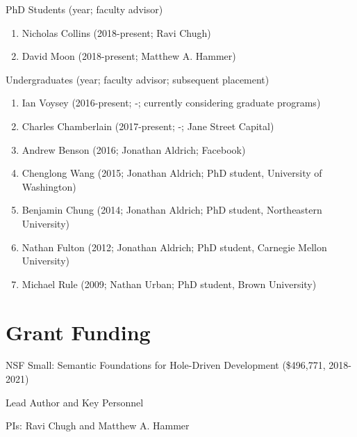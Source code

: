 \documentclass[10pt,letterpaper]{article}
\renewenvironment{itemize}{
  \begin{list}{}{
    \setlength{\leftmargin}{1.25em}
    \setlength{\itemsep}{0.25em}
    \setlength{\parskip}{0pt}
    \setlength{\parsep}{0.2em}
  }
}{
  \end{list}
}
\begin{document}
\begin{itemize}
\item PhD Students (year; faculty advisor)
  \begin{enumerate}
    \item Nicholas Collins (2018-present; Ravi Chugh)
    \item David Moon (2018-present; Matthew A. Hammer)
  \end{enumerate}
\item Undergraduates (year; faculty advisor; subsequent placement)
  \begin{enumerate}
  \item Ian Voysey (2016-present; -; currently considering graduate programs)
  \item Charles Chamberlain (2017-present; -; Jane Street Capital)
  \item Andrew Benson (2016; Jonathan Aldrich; Facebook)
  \item Chenglong Wang (2015; Jonathan Aldrich; PhD student, University of Washington)
  \item Benjamin Chung (2014; Jonathan Aldrich; PhD student, Northeastern University)
  \item Nathan Fulton (2012; Jonathan Aldrich; PhD student, Carnegie Mellon University)
  \item Michael Rule (2009; Nathan Urban; PhD student, Brown University)
  \end{enumerate}
\end{itemize}





\section*{Grant Funding}

\begin{itemize}
  \item NSF Small: Semantic Foundations for Hole-Driven Development (\$496,771, 2018-2021)
    \begin{itemize}
      \item Lead Author and Key Personnel
      \item PIs: Ravi Chugh and Matthew A. Hammer
    \end{itemize}
\end{itemize}

\end{document}
